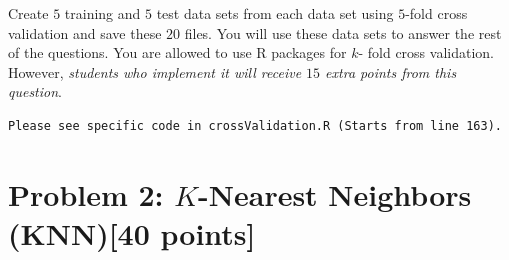 \documentclass{article}
\begin{document}
Create $5$ training and $5$ test data sets from each data set using  $5$-fold cross validation and save these $20$ files. You will use these data sets to answer the rest of the questions. You are allowed to use R packages for $k$- fold cross validation. However,\textit{ students who implement it will receive $15$ extra points from this question}.

\begin{verbatim}
Please see specific code in crossValidation.R (Starts from line 163).
\end{verbatim}

\section*{Problem 2: $K$-Nearest Neighbors (KNN)[40 points]} 
\end{document}
